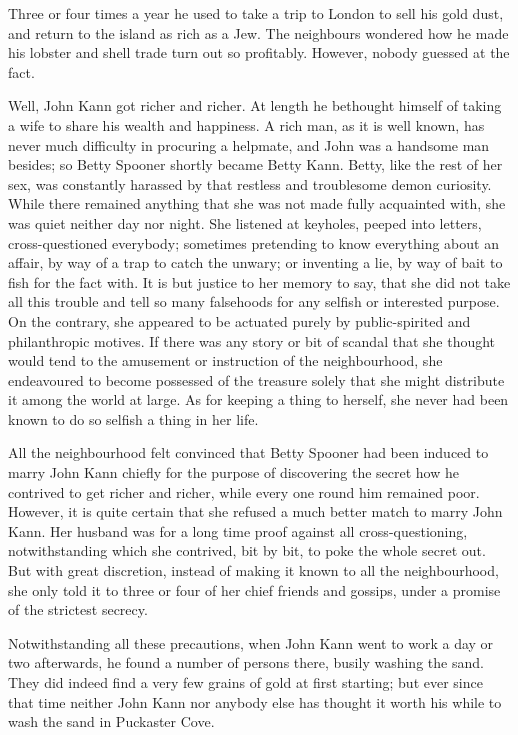 \documentclass[
  12pt,
  a5paper,
  twoside]{book}
\begin{document}
Three or four times a year he used to take a trip to London to sell his
gold dust, and return to the island as rich as a Jew. The neighbours
wondered how he made his lobster and shell trade turn out so profitably.
However, nobody guessed at the fact.

Well, John Kann got richer and richer. At length he bethought himself of
taking a wife to share his wealth and happiness. A rich man, as it is
well known, has never much difficulty in procuring a helpmate, and John
was a handsome man besides; so Betty Spooner shortly became Betty Kann.
Betty, like the rest of her sex, was constantly harassed by that
restless and troublesome demon curiosity. While there remained anything
that she was not made fully acquainted with, she was quiet neither day
nor night. She listened at keyholes, peeped into letters,
cross-questioned everybody; sometimes pretending to know everything
about an affair, by way of a trap to catch the unwary; or inventing a
lie, by way of bait to fish for the fact with. It is but justice to her
memory to say, that she did not take all this trouble and tell so many
falsehoods for any selfish or interested purpose. On the contrary, she
appeared to be actuated purely by public-spirited and philanthropic
motives. If there was any story or bit of scandal that she thought would
tend to the amusement or instruction of the neighbourhood, she
endeavoured to become possessed of the treasure solely that she might
distribute it among the world at large. As for keeping a thing to
herself, she never had been known to do so selfish a thing in her life.

All the neighbourhood felt convinced that Betty Spooner had been induced
to marry John Kann chiefly for the purpose of discovering the secret how
he contrived to get richer and richer, while every one round him
remained poor. However, it is quite certain that she refused a much
better match to marry John Kann. Her husband was for a long time proof
against all cross-questioning, notwithstanding which she contrived, bit
by bit, to poke the whole secret out. But with great discretion, instead
of making it known to all the neighbourhood, she only told it to three
or four of her chief friends and gossips, under a promise of the
strictest secrecy.

Notwithstanding all these precautions, when John Kann went to work a day
or two afterwards, he found a number of persons there, busily washing
the sand. They did indeed find a very few grains of gold at first
starting; but ever since that time neither John Kann nor anybody else
has thought it worth his while to wash the sand in Puckaster Cove.
\end{document}
